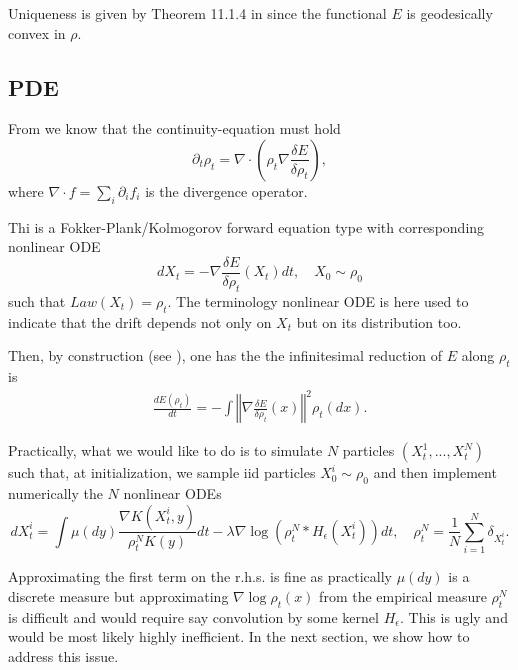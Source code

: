 \documentclass[a4paper]{article}
\theoremstyle{definition}
\begin{document}
Uniqueness is given by Theorem 11.1.4 in \cite{ambrosio2008gradient} since the functional $E$ is geodesically convex in $\rho$.

\subsection{PDE}
From \citet[Definition 11.1.1]{ambrosio2008gradient} we know that the continuity-equation must hold
\begin{equation}
\label{eq:pde}
\partial_{t}\rho_{t}=\nabla\cdot\left(\rho_{t}\nabla\frac{\delta E}{\delta\rho_{t}}\right),
\end{equation}
where $\nabla\cdot f=\sum_{i}\partial_{i}f_{i}$ is the divergence operator.

Thi is a Fokker-Plank/Kolmogorov forward equation type with corresponding nonlinear ODE \citep{jordan1998variational}
\begin{equation}
dX_{t}=-\nabla\frac{\delta E}{\delta\rho_{t}}\left(X_{t}\right)dt,\quad X_{0}\sim\rho_{0}\label{eq:nonlinearODE}
\end{equation}
such that $Law(X_{t})=\rho_{t}$.
The terminology nonlinear ODE is here used to indicate that the drift depends not only on $X_{t}$ but on its distribution too.

Then, by construction (see \citet[page 14]{arbel2019maximum}), one has the the infinitesimal reduction of $E$ along $\rho_t$ is
\begin{align*}
\frac{dE\left(\rho_{t}\right)}{dt}=-\int\left\Vert \nabla\frac{\delta E}{\delta\rho_{t}}\left(x\right)\right\Vert ^{2}\rho_{t}\left(dx\right).
\end{align*}


Practically, what we would like to do is to simulate $N$ particles $(X_{t}^{1},...,X_{t}^{N})$ such that, at initialization, we sample iid particles  $X_{0}^{i}\sim\rho_{0}$ and then implement numerically the $N$ nonlinear ODEs
\[
dX_{t}^{i}=\int\mu\left(dy\right)\frac{\nabla K(X_{t}^{i},y)}{\rho_{t}^{N}K(y)}dt-\lambda\nabla\log\left(\rho_{t}^{N}*H_{\epsilon}\left(X_{t}^{i}\right)\right)dt,\quad\rho_{t}^{N}=\frac{1}{N}\sum_{i=1}^{N}\delta_{X_{t}^{i}}.
\]

Approximating the first term on the r.h.s. is fine as practically $\mu\left(dy\right)$ is a discrete measure but approximating $\nabla\log\rho_{t}\left(x\right)$ from the empirical measure $\rho_{t}^{N}$ is difficult and would require say convolution by some kernel $H_{\epsilon}$.
This is ugly and would be most likely highly inefficient.
In the next section, we show how to address this issue.
\end{document}
